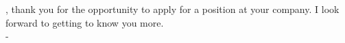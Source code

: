 \censor{\companyName}, thank you for the opportunity to apply for a position at your company. I look forward to getting to know you more. \\
\hfill - \censor{\firstName} ~~~~~~~~~~~~~~~~~~~~~~~